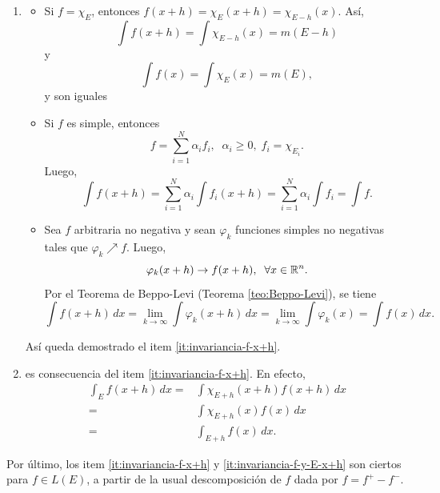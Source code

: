                     \begin{demo}
                    \begin{enumerate}
                        \item 
                    \begin{itemize}
                        \item Si $f=\chi_E$, entonces 
                        $f(x+h)=\chi_E (x+h) =\chi_{E-h}(x).$
                        As\'i, 
                        \[
                        \int f(x+h)= \int \chi_{E-h} (x) =m(E-h)
                        \]
                        y 
                        \[
                        \int f(x) = \int \chi_E(x)=m(E),
                        \]
                        y son iguales
                        \item Si $f$ es simple, entonces 
                        \[  f=\sum\limits_{i=1}^N \alpha_i f_i, \;\; \alpha_i\geq 0,\;f_i=\chi_{E_i}.
                        \]
                        Luego, 
                        \[
                        \int f(x+h) =\sum\limits_{i=1}^N \alpha_i \int f_i(x+h)=
                        \sum\limits_{i=1}^N \alpha_i \int f_i= \int f.
                        \]
                        \item Sea $f$ arbitraria no negativa y sean $\varphi_k$ funciones simples no negativas tales que $\varphi_k \nearrow f$. Luego, 
                        \[
                        \varphi_k(x+h)\to f(x+h), \;\;\forall x \in \mathbb{R}^n.
                        \]
                        Por el Teorema de Beppo-Levi (Teorema \ref{teo:Beppo-Levi}), se tiene
                        \[
                        \int f(x+h)\,dx=\lim\limits_{k \to \infty} \int \varphi_k(x+h)\,dx=
                        \lim\limits_{k\to \infty} \int \varphi_k(x) =\int f(x)\,dx.
                        \]
                    \end{itemize}
                    As\'i queda demostrado el item \ref{it:invariancia-f-x+h}.
                    \item es consecuencia del item \ref{it:invariancia-f-x+h}. En efecto, 
                    \[\begin{split} 
                    \int_E f(x+h) \,dx=& \int \chi_{E+h}(x+h) f(x+h) \,dx
                    \\
                    =&
                    \int \chi_{E+h} (x) f(x)\,dx 
                    \\
                    =&
                    \int_{E+h} f(x)\,dx.
                    \end{split}\]
                    \end{enumerate}
                    Por \'ultimo, los item \ref{it:invariancia-f-x+h} y   \ref{it:invariancia-f-y-E-x+h} son ciertos para $f\in L(E)$,  a partir de la usual descomposici\'on de $f$ dada por $f=f^{+}-f^{-}$.
                    \end{demo}
                    
